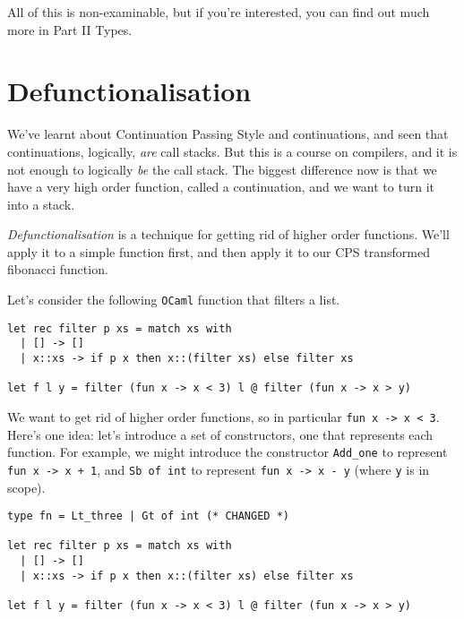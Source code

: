 All of this is non-examinable, but if you're interested, you can find out much more in {\sffamily Part II Types}.

\section{Defunctionalisation}
We've learnt about Continuation Passing Style and continuations, and seen that continuations, logically, \emph{are} call stacks. But this is a course on compilers, and it is not enough to logically \emph{be} the call stack. The biggest difference now is that we have a very high order function, called a continuation, and we want to turn it into a stack. 

\emph{Defunctionalisation} is a technique for getting rid of higher order functions. We'll apply it to a simple function first, and then apply it to our CPS transformed fibonacci function. 

Let's consider the following \texttt{OCaml} function that filters a list.

\begin{code}
\label{code:defun-0}
\begin{verbatim}
let rec filter p xs = match xs with
  | [] -> []
  | x::xs -> if p x then x::(filter xs) else filter xs

let f l y = filter (fun x -> x < 3) l @ filter (fun x -> x > y)
\end{verbatim}
\end{code}

We want to get rid of higher order functions, so in particular \texttt{fun x -> x < 3}. Here's one idea: let's introduce a set of constructors, one that represents each function. For example, we might introduce the constructor \texttt{Add\_one} to represent \texttt{fun x -> x + 1}, and \texttt{Sb of int} to represent \texttt{fun x -> x - y} (where \texttt{y} is in scope).

\begin{code}
\label{code:defun-1}
\begin{verbatim}
type fn = Lt_three | Gt of int (* CHANGED *)

let rec filter p xs = match xs with
  | [] -> []
  | x::xs -> if p x then x::(filter xs) else filter xs

let f l y = filter (fun x -> x < 3) l @ filter (fun x -> x > y)
\end{verbatim}
\end{code}

